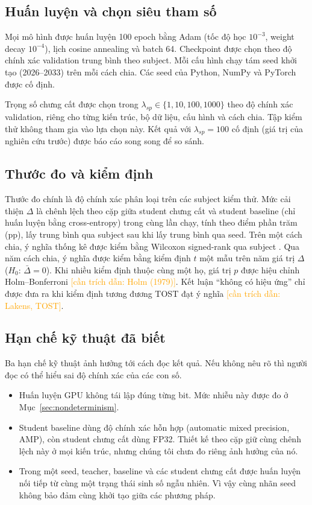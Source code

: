 \documentclass[10pt]{article} %
\newcommand{\cantrich}[1]{\textcolor{orange}{[cần trích dẫn: #1]}}
\begin{document}
\subsection{Huấn luyện và chọn siêu tham số}

Mọi mô hình được huấn luyện 100 epoch bằng Adam (tốc độ học $10^{-3}$, weight decay $10^{-4}$), lịch cosine annealing và batch 64. Checkpoint được chọn theo độ chính xác validation trung bình theo subject. Mỗi cấu hình chạy tám seed khởi tạo (2026--2033) trên mỗi cách chia. Các seed của Python, NumPy và PyTorch được cố định.

Trọng số chưng cất được chọn trong $\lambda_{sp} \in \{1, 10, 100, 1000\}$ theo độ chính xác validation, riêng cho từng kiến trúc, bộ dữ liệu, cấu hình và cách chia. Tập kiểm thử không tham gia vào lựa chọn này. Kết quả với $\lambda_{sp}=100$ cố định (giá trị của nghiên cứu trước) được báo cáo song song để so sánh.

\subsection{Thước đo và kiểm định}

Thước đo chính là độ chính xác phân loại trên các subject kiểm thử. Mức cải thiện $\Delta$ là chênh lệch theo cặp giữa student chưng cất và student baseline (chỉ huấn luyện bằng cross-entropy) trong cùng lần chạy, tính theo điểm phần trăm (pp), lấy trung bình qua subject sau khi lấy trung bình qua seed. Trên một cách chia, ý nghĩa thống kê được kiểm bằng Wilcoxon signed-rank qua subject \citep{wilcoxon1945individual}. Qua năm cách chia, ý nghĩa được kiểm bằng kiểm định $t$ một mẫu trên năm giá trị $\Delta$ ($H_0$: $\bar\Delta = 0$). Khi nhiều kiểm định thuộc cùng một họ, giá trị $p$ được hiệu chỉnh Holm--Bonferroni \cantrich{Holm (1979)}. Kết luận ``không có hiệu ứng'' chỉ được đưa ra khi kiểm định tương đương TOST đạt ý nghĩa \cantrich{Lakens, TOST}.

\subsection{Hạn chế kỹ thuật đã biết}

Ba hạn chế kỹ thuật ảnh hưởng tới cách đọc kết quả. Nếu không nêu rõ thì người đọc có thể hiểu sai độ chính xác của các con số.
\begin{itemize}
    \item Huấn luyện GPU không tái lập đúng từng bit. Mức nhiễu này được đo ở Mục~\ref{sec:nondeterminism}.
    \item Student baseline dùng độ chính xác hỗn hợp (automatic mixed precision, AMP), còn student chưng cất dùng FP32. Thiết kế theo cặp giữ cùng chênh lệch này ở mọi kiến trúc, nhưng chúng tôi chưa đo riêng ảnh hưởng của nó.
    \item Trong một seed, teacher, baseline và các student chưng cất được huấn luyện nối tiếp từ cùng một trạng thái sinh số ngẫu nhiên. Vì vậy cùng nhãn seed không bảo đảm cùng khởi tạo giữa các phương pháp.
\end{itemize}
\end{document}
